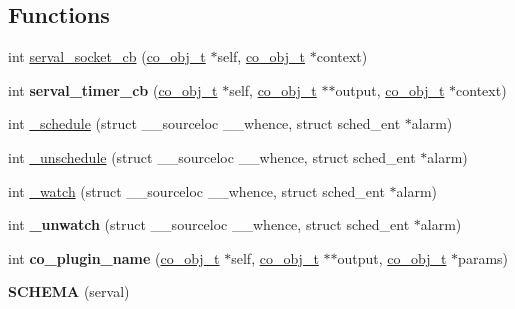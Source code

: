 \subsection*{Functions}
\begin{DoxyCompactItemize}
\item 
int \hyperlink{serval-dna_8c_a1555be4d16034b506577764fbd2cfb5d}{serval\+\_\+socket\+\_\+cb} (\hyperlink{structco__obj__t}{co\+\_\+obj\+\_\+t} $\ast$self, \hyperlink{structco__obj__t}{co\+\_\+obj\+\_\+t} $\ast$context)
\item 
\hypertarget{serval-dna_8c_a00d4df9eabb0ac594cc118143943392f}{int {\bfseries serval\+\_\+timer\+\_\+cb} (\hyperlink{structco__obj__t}{co\+\_\+obj\+\_\+t} $\ast$self, \hyperlink{structco__obj__t}{co\+\_\+obj\+\_\+t} $\ast$$\ast$output, \hyperlink{structco__obj__t}{co\+\_\+obj\+\_\+t} $\ast$context)}\label{serval-dna_8c_a00d4df9eabb0ac594cc118143943392f}

\item 
int \hyperlink{serval-dna_8c_ac6820e398043d975ed62c7ef795b4bb9}{\+\_\+schedule} (struct \+\_\+\+\_\+sourceloc \+\_\+\+\_\+whence, struct sched\+\_\+ent $\ast$alarm)
\item 
int \hyperlink{serval-dna_8c_a0ac6aba06cbf32257e8d8780e7e714d7}{\+\_\+unschedule} (struct \+\_\+\+\_\+sourceloc \+\_\+\+\_\+whence, struct sched\+\_\+ent $\ast$alarm)
\item 
int \hyperlink{serval-dna_8c_abdd84be4acf337a90ceac0a33493a41b}{\+\_\+watch} (struct \+\_\+\+\_\+sourceloc \+\_\+\+\_\+whence, struct sched\+\_\+ent $\ast$alarm)
\item 
\hypertarget{serval-dna_8c_a48af839503a9b8e7cdea4139c0df172e}{int {\bfseries \+\_\+unwatch} (struct \+\_\+\+\_\+sourceloc \+\_\+\+\_\+whence, struct sched\+\_\+ent $\ast$alarm)}\label{serval-dna_8c_a48af839503a9b8e7cdea4139c0df172e}

\item 
\hypertarget{serval-dna_8c_ab65e09211a66e5e4a54fcb0e963af7fe}{int {\bfseries co\+\_\+plugin\+\_\+name} (\hyperlink{structco__obj__t}{co\+\_\+obj\+\_\+t} $\ast$self, \hyperlink{structco__obj__t}{co\+\_\+obj\+\_\+t} $\ast$$\ast$output, \hyperlink{structco__obj__t}{co\+\_\+obj\+\_\+t} $\ast$params)}\label{serval-dna_8c_ab65e09211a66e5e4a54fcb0e963af7fe}

\item 
\hypertarget{serval-dna_8c_adc9141d5a1e77b476cdbbda5368d280b}{{\bfseries S\+C\+H\+E\+M\+A} (serval)}\label{serval-dna_8c_adc9141d5a1e77b476cdbbda5368d280b}


\end{DoxyCompactItemize}
